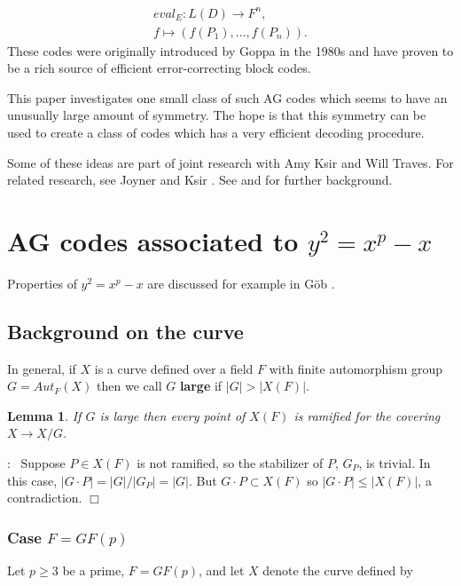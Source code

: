 \documentclass[12pt]{article}
\newtheorem{lemma}[theorem]{Lemma}
\numberwithin{equation}{section}
\def\pf{\noindent {\bf Proof}:\ }
\def\qed{$\Box$}
\begin{document}
\begin{equation}
\label{eqn:eval}
\begin{array}{c}
eval_E:L(D)\rightarrow F^n,\\
f \longmapsto (f(P_1),...,f(P_n)).
\end{array}
\end{equation}
These codes were originally introduced by Goppa in the 
1980s and have proven to be a rich source of 
efficient error-correcting block codes.

This paper investigates one small class of such AG codes
which seems to have an unusually large amount of
symmetry. The hope is that this symmetry can be used to 
create a class of codes which has a very efficient
decoding procedure.

Some of these ideas are part of joint research with Amy Ksir and Will Traves.
For related research, see Joyner and Ksir \cite{JK1}.
See \cite{JK2} and \cite{JT} for further background.

\section{AG codes associated to $y^2=x^p-x$}

Properties of $y^2=x^p-x$ are discussed for example in 
G\"ob \cite{G}.

\subsection{Background on the curve}

In general, if $X$ is a curve defined over a field $F$
with finite automorphism group $G=Aut_F(X)$ then we call
$G$ {\bf large} if $|G|>|X(F)|$.

\begin{lemma}
\label{lemma:large}
If $G$ is large then every point of $X(F)$
is ramified for the covering $X\rightarrow X/G$.
\end{lemma}

\pf
Suppose $P\in X(F)$ is not ramified, so the stabilizer of $P$,
$G_P$, is trivial. In this case,
$|G\cdot P|= |G|/|G_P|= |G|$. But $G\cdot P\subset X(F)$
so $|G\cdot P|\leq |X(F)|$, a contradiction. \qed

\subsubsection{Case $F=GF(p)$}
\label{sec:F=GF(p)}

Let $p\geq 3$ be a prime,
$F=GF(p)$, and let $X$ denote the curve defined by
\end{document}
